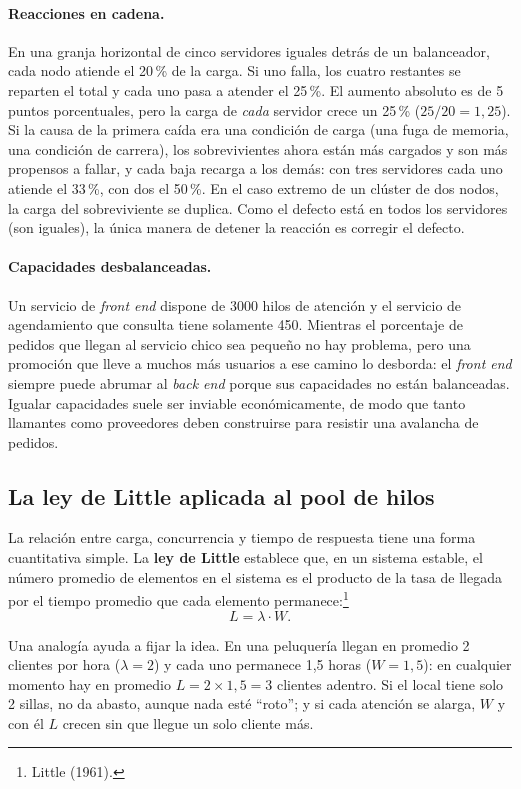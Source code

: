 \documentclass[variant=apuntes,cover=institutional,mode=screen]{ua-engineering-v6-article}
\begin{document}
\paragraph{Reacciones en cadena.} En una granja horizontal de cinco servidores iguales detrás de un balanceador, cada nodo atiende el 20\,\% de la carga. Si uno falla, los cuatro restantes se reparten el total y cada uno pasa a atender el 25\,\%. El aumento absoluto es de 5 puntos porcentuales, pero la carga de \emph{cada} servidor crece un 25\,\% ($25/20 = 1{,}25$). Si la causa de la primera caída era una condición de carga (una fuga de memoria, una condición de carrera), los sobrevivientes ahora están más cargados y son más propensos a fallar, y cada baja recarga a los demás: con tres servidores cada uno atiende el 33\,\%, con dos el 50\,\%. En el caso extremo de un clúster de dos nodos, la carga del sobreviviente se duplica. Como el defecto está en todos los servidores (son iguales), la única manera de detener la reacción es corregir el defecto.

\paragraph{Capacidades desbalanceadas.} Un servicio de \emph{front end} dispone de 3000 hilos de atención y el servicio de agendamiento que consulta tiene solamente 450. Mientras el porcentaje de pedidos que llegan al servicio chico sea pequeño no hay problema, pero una promoción que lleve a muchos más usuarios a ese camino lo desborda: el \emph{front end} siempre puede abrumar al \emph{back end} porque sus capacidades no están balanceadas. Igualar capacidades suele ser inviable económicamente, de modo que tanto llamantes como proveedores deben construirse para resistir una avalancha de pedidos.

\subsection{La ley de Little aplicada al pool de hilos}

La relación entre carga, concurrencia y tiempo de respuesta tiene una forma cuantitativa simple. La \textbf{ley de Little} establece que, en un sistema estable, el número promedio de elementos en el sistema es el producto de la tasa de llegada por el tiempo promedio que cada elemento permanece:\footnote{Little (1961).}
\[
L = \lambda \cdot W.
\]

Una analogía ayuda a fijar la idea. En una peluquería llegan en promedio 2 clientes por hora ($\lambda = 2$) y cada uno permanece 1,5 horas ($W = 1{,}5$): en cualquier momento hay en promedio $L = 2 \times 1{,}5 = 3$ clientes adentro. Si el local tiene solo 2 sillas, no da abasto, aunque nada esté ``roto''; y si cada atención se alarga, $W$ y con él $L$ crecen sin que llegue un solo cliente más.
\end{document}
